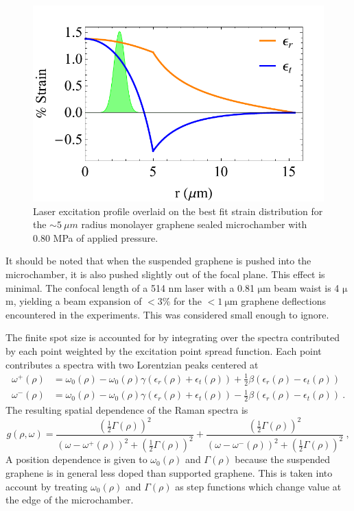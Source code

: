 \begin{figure}
	\begin{center}
	\includegraphics{Figs_Fit/SB02-1_StrainWithLaser.pdf}
	\caption[Laser excitation profile overlaid on strain distribution]{\label{Fig:Fit:FiniteSpot}Laser excitation profile overlaid on the best fit strain distribution for the $\sim 5 \ \mu m$ radius monolayer graphene sealed microchamber with 0.80 MPa of applied pressure.}
	\end{center}
\end{figure}

It should be noted that when the suspended graphene is pushed into the microchamber, it is also pushed slightly out of the focal plane.
This effect is minimal.
The confocal length of a 514 nm laser with a 0.81 $\mathrm{\mu}$m beam waist is 4 $\mathrm{\mu}$m, yielding a beam expansion of $<3\%$ for the $<1 \ \mathrm{\mu m}$ graphene deflections encountered in the experiments.
This was considered small enough to ignore.

The finite spot size is accounted for by integrating over the spectra contributed by each point weighted by the excitation point spread function.
Each point contributes a spectra with two Lorentzian peaks centered at
\begin{align*}
	\omega^+ (\rho)&=\omega_0(\rho)-\omega_0(\rho) \gamma(\epsilon_{r}(\rho)+\epsilon_{t}(\rho)) 
		+ \frac{1}{2} \beta (\epsilon_{r}(\rho)-\epsilon_{t}(\rho)) \\
	\omega^-(\rho)&=\omega_0(\rho)-\omega_0(\rho) \gamma(\epsilon_{r}(\rho)+\epsilon_{t}(\rho))
		- \frac{1}{2} \beta (\epsilon_{r}(\rho)-\epsilon_{t}(\rho)) \ .
\end{align*}
The resulting spatial dependence of the Raman spectra is
\begin{equation*}
	g(\rho,\omega)=
	\frac{\left(\frac{1}{2} \Gamma(\rho) \right)^2}
	{\left(\omega-\omega^+(\rho) \right)^2+\left(\frac{1}{2} \Gamma(\rho) \right)^2}+
	\frac{\left(\frac{1}{2} \Gamma(\rho) \right)^2}
	{\left(\omega-\omega^-(\rho) \right)^2+\left(\frac{1}{2} \Gamma(\rho) \right)^2} \ ,
\end{equation*}
A position dependence is given to $\omega_0(\rho)$ and $\Gamma(\rho)$ because the suspended graphene is in general less doped than supported graphene.
This is taken into account by treating $\omega_0(\rho)$ and $\Gamma(\rho)$ as step functions which change value at the edge of the microchamber.

